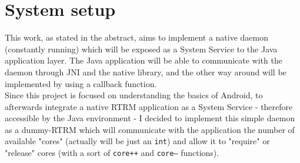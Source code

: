 \section{System setup}
\label{Customising}
This work, as stated in the abstract, aims to implement a native daemon (constantly running) which will be exposed as a System Service to the Java application layer. The Java application will be able to communicate with the daemon through JNI and the native library, and the other way around will be implemented by using a callback function.\\
Since this project is focused on understanding the basics of Android, to afterwards integrate a native RTRM application as a System Service - therefore accessible by the Java environment - I decided to implement this simple daemon as a dummy-RTRM which will communicate with the application the number of available "cores" (actually will be just an \texttt{int}) and allow it to "require" or "release" cores (with a sort of \texttt{core++} and \texttt{core--} functions).
